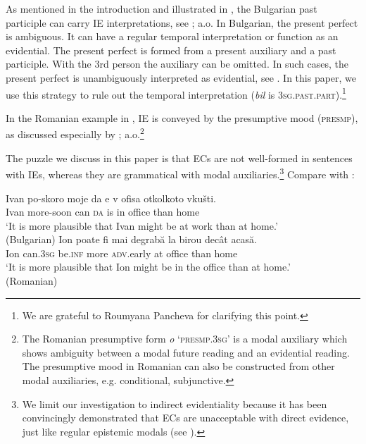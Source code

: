 \documentclass[output=paper,
]{langscibook}
\begin{document}
\noindent As mentioned in the introduction and illustrated in , the Bulgarian past participle can carry IE interpretations, see \citet{jakob156,comrie76,palmer86,izv97,alexetal03,mistom06b}; a.o. In Bulgarian, the present perfect is ambiguous. It can have a regular temporal interpretation or function as an evidential. The present perfect is formed from a present auxiliary and a past participle. With the 3rd person the auxiliary can be omitted. In such cases, the present perfect is unambiguously interpreted as evidential, see \cite[fn. 7]{izv97}. In this paper, we use this strategy to rule out the temporal interpretation (\textit{bil} is \textsc{3sg.past.part}).\footnote{We are grateful to Roumyana Pancheva for clarifying this point.}

In the Romanian example in , IE is conveyed by the presumptive mood (\textsc{presmp}), as discussed especially by \citet{slavel56,cos76,reinhrip00,squ01,iri10,iri18}; a.o.\footnote{The Romanian presumptive form \textit{o} `\textsc{presmp.3sg}' is a modal auxiliary which shows ambiguity between a modal future reading and an evidential reading. The presumptive mood in Romanian can also be constructed from other modal auxiliaries, e.g. conditional, subjunctive.\label{fn:presmp}}

The puzzle we discuss in this paper is that ECs are not well-formed in sentences with IEs, whereas they are grammatical with modal auxiliaries.\footnote{We limit our investigation to indirect evidentiality because it has been convincingly demonstrated that ECs are unacceptable with direct evidence, just like regular epistemic modals (see \citealt{herrub14}).}
Compare  with :

	\ea \label{mobs1}  \label{IllformedECwithIIE} 
 \label{IllformedECwithIIERom} 
    \z \z
    
    \ea \label{mobs2} \ea \gll Ivan po-skoro moje da e 	v	ofisa	otkolkoto vkušti.   \\
    Ivan	more-soon	
  can \textsc{da} is 	in	office	than home \\
      \glt  `It is more plausible that Ivan might be at work than at home.'\\\xspace\hfill (Bulgarian)
	\ex \gll Ion	poate 	fi		mai	degrabă	la 	birou decât acasă.\\ 
	Ion 	can.\textsc{3sg}	be.\textsc{inf}	more \textsc{adv}.early at office than home \\
	\glt `It is more plausible that Ion might be in the office than at home.'\\\xspace\hfill (Romanian)
	\z \z
	
\end{document}
